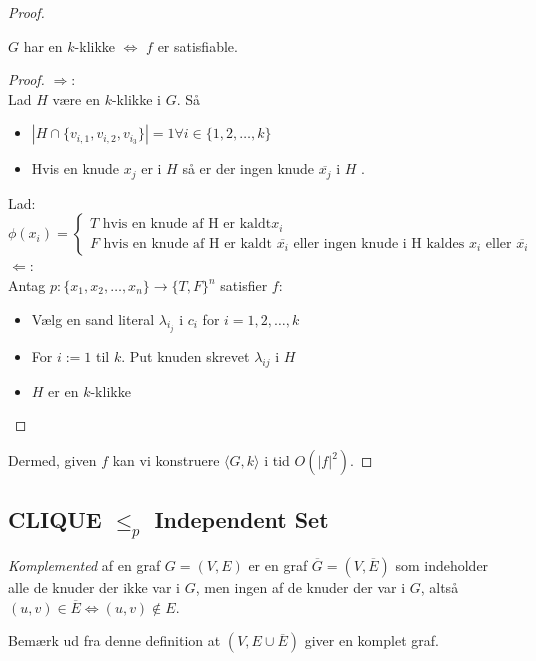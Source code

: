 \begin{proof}
	\begin{claim}
		$G$ har en $k$-klikke $\iff$ $f$ er satisfiable.
	\end{claim}

	\begin{proof}
		\(\Rightarrow\):\\
		\noindent
		Lad $H$ være en $k$-klikke  i $G$. Så
		\begin{itemize}
			\item $|H \cap \{v_{i,{1}}, v_{i,2}, v_{i_{3}}\}| = 1 \forall i \in \{1, 2, \ldots, k\}$
			\item Hvis en knude $x_{j}$ er i $H$ så er der ingen knude $\overline{x_{j}}$ i $H$ .
		\end{itemize}
		Lad:
		\begin{equation*}
			\phi(x_{i}) = \begin{cases}
				T \text{ hvis  en knude af H er kaldt} x_{i} \\
				F \text{ hvis en knude af H er kaldt } \overline{x_{i}} \text{ eller ingen knude i H kaldes } x_{i} \text{ eller }  \overline{x_{i}}
			\end{cases}
		\end{equation*}
		\(\Leftarrow\): \\
		\noindent
		Antag $p : \{x_{1}, x_{2}, \ldots, x_{n}\} \rightarrow \{T, F\}^{n}$ satisfier $f$:
		\begin{itemize}
			\item Vælg en sand literal \(\lambda_{i_{j}}\) i $c_{i}$ for $i = 1, 2, \ldots, k$
			\item For $i := 1$ til $k$. Put knuden skrevet $\lambda_{ij}$ i $H$
			\item $H$ er en $k$-klikke
		\end{itemize}
	\end{proof}
	Dermed, given $f$ kan vi konstruere $\langle G, k \rangle$ i tid $O(|f|^{2})$.
\end{proof}

\subsection{CLIQUE $\le_{p}$ Independent Set}%
\label{subsec:label}



\begin{definition}
	\textit{Komplemented} af en graf $G = (V, E)$ er en graf $\overline{G} = (V, \overline{E})$ som indeholder alle de knuder der ikke var i $G$, men ingen af de knuder der var i $G$, altså $(u,v) \in \overline{E} \iff (u,v) \notin E$.
\end{definition}
Bemærk ud fra denne definition at $(V, E \cup \overline{E})$ giver en komplet graf.

